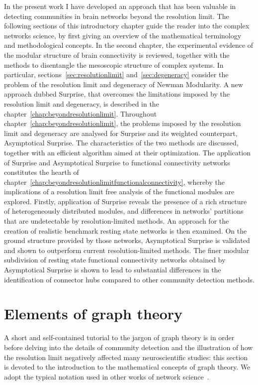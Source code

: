 \documentclass[11pt,              a4paper,              twoside,openright,              titlepage,              headinclude,footinclude,                            numbers=noenddot,              cleardoublepage=empty,]{scrreprt}
\begin{document}
In the present work I have developed an approach that has been valuable in detecting communities in brain networks beyond the resolution limit. The following sections of this introductory chapter guide the reader into the complex networks science, by first giving an overview of the mathematical terminology and methodological concepts.
In the second chapter, the experimental evidence of the modular structure of brain connectivity is reviewed, together with the methods to disentangle the mesoscopic structure of complex systems. In particular, sections~\ref{sec:resolutionlimit} and~\ref{sec:degeneracy} consider the problem of the resolution limit and degeneracy of Newman Modularity.
A new approach dubbed Surprise, that overcomes the limitations imposed by the resolution limit and degeneracy, is described in the chapter~\ref{chap:beyondresolutionlimit}. Throughout chapter~\ref{chap:beyondresolutionlimit}, the problems imposed by the resolution limit and degeneracy are analysed for Surprise and its weighted counterpart, Asymptotical Surprise. The characteristics of the two methods are discussed, together with an efficient algorithm aimed at their optimization.
The application of Surprise and Asymptotical Surprise to functional connectivity networks constitutes the hearth of chapter~\ref{chap:beyondresolutionlimitfunctionalconnectivity}, whereby the implications of a resolution limit free analysis of the functional modules are explored. Firstly, application of Surprise reveals the presence of a rich structure of heterogeneously distributed modules, and differences in networks' partitions that are undetectable by resolution-limited methods. An approach for the creation of realistic benchmark resting state networks is then examined. On the ground structure provided by those networks, Asymptotical Surprise is validated and shown to outperform current resolution-limited methods. The finer modular subdivision of resting state functional connectivity networks obtained by Asymptotical Surprise is shown to lead to substantial differences in the identification of connector hubs compared to other community detection methods.


\section{Elements of graph theory}\label{sec:elementsofgraphtheory}
A short and self-contained tutorial to the jargon of graph theory is in order before delving into the details of community detection and the illustration of how the resolution limit negatively affected many neuroscientific studies: this section is devoted to the introduction to the mathematical concepts of graph theory.
We adopt the typical notation used in other works of network science~\cite{newman2010book,estrada2011}.
\end{document}
